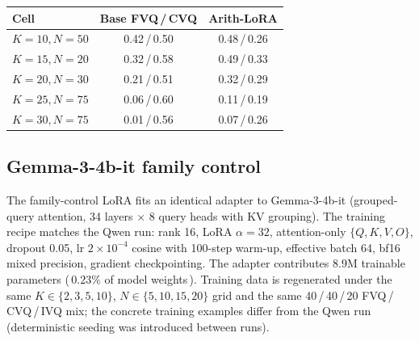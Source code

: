 \documentclass[11pt]{article}
\begin{document}
\begin{table}[!htb]
\centering
\begin{minipage}[t]{0.40\textwidth}
\centering
\footnotesize
\setlength{\tabcolsep}{3pt}
\begin{tabular}{lcc}
\toprule
Cell & Base FVQ\,/\,CVQ & Arith-LoRA \\
\midrule
$K{=}10, N{=}50$ & 0.42\,/\,0.50 & 0.48\,/\,0.26 \\
$K{=}15, N{=}20$ & 0.32\,/\,0.58 & 0.49\,/\,0.33 \\
$K{=}20, N{=}30$ & 0.21\,/\,0.51 & 0.32\,/\,0.29 \\
$K{=}25, N{=}75$ & 0.06\,/\,0.60 & 0.11\,/\,0.19 \\
$K{=}30, N{=}75$ & 0.01\,/\,0.56 & 0.07\,/\,0.26 \\
\bottomrule
\end{tabular}
\label{tab:lora_arith_control}
\end{minipage}
\hfill
\begin{minipage}[t]{0.56\textwidth}
\centering
\scriptsize

\label{tab:lora_arb_full}
\end{minipage}
\end{table}

\subsection{Gemma-3-4b-it family control}
\label{app:lora_gemma}

The family-control LoRA fits an identical adapter to
Gemma-3-4b-it (grouped-query attention, 34 layers $\times$ 8 query
heads with KV grouping). The training recipe matches the Qwen run:
rank 16, LoRA $\alpha=32$, attention-only $\{Q, K, V, O\}$,
dropout 0.05, lr $2\times10^{-4}$ cosine with 100-step warm-up,
effective batch 64, bf16 mixed precision, gradient checkpointing.
The adapter contributes $8.9\text{M}$ trainable parameters
(\,$0.23\%$ of model weights\,). Training data is regenerated under
the same $K \in \{2, 3, 5, 10\}$, $N \in \{5, 10, 15, 20\}$ grid
and the same 40\,/\,40\,/\,20 FVQ\,/\,CVQ\,/\,IVQ mix; the concrete
training examples differ from the Qwen run (deterministic seeding
was introduced between runs).
\end{document}
